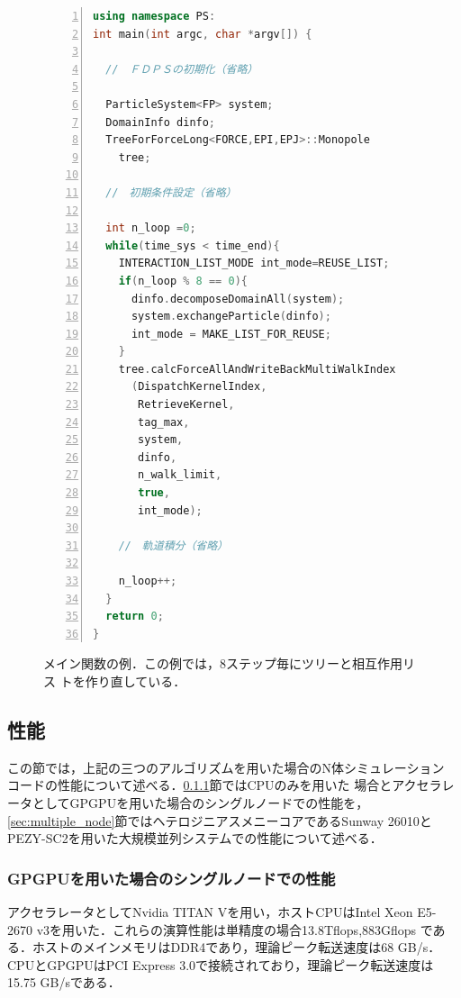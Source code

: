 \documentclass[submit]{ipsj}
\begin{document}
\begin{figure}[!h]
\begin{lstlisting}[language=c++,numbers=left,numbersep=5pt,frame=single,basicstyle=\ttfamily]
using namespace PS:    
int main(int argc, char *argv[]) {
      
  //　ＦＤＰＳの初期化（省略）
  
  ParticleSystem<FP> system;
  DomainInfo dinfo;
  TreeForForceLong<FORCE,EPI,EPJ>::Monopole
    tree;

  //　初期条件設定（省略）

  int n_loop =0;
  while(time_sys < time_end){
    INTERACTION_LIST_MODE int_mode=REUSE_LIST;    
    if(n_loop % 8 == 0){
      dinfo.decomposeDomainAll(system);
      system.exchangeParticle(dinfo);
      int_mode = MAKE_LIST_FOR_REUSE;
    }
    tree.calcForceAllAndWriteBackMultiWalkIndex
      (DispatchKernelIndex,
       RetrieveKernel,
       tag_max,
       system,
       dinfo,
       n_walk_limit,
       true,
       int_mode);

    //　軌道積分（省略）

    n_loop++;
  }
  return 0;
}

\end{lstlisting}
\caption{メイン関数の例．この例では，8ステップ毎にツリーと相互作用リス
  トを作り直している．}
\label{code:main}
\end{figure}
  
\subsection{性能}

この節では，上記の三つのアルゴリズムを用いた場合のN体シミュレーション
コードの性能について述べる．\ref{sec:single_node}節ではCPUのみを用いた
場合とアクセラレータとしてGPGPUを用いた場合のシングルノードでの性能を，
\ref{sec:multiple_node}節ではヘテロジニアスメニーコアであるSunway
26010とPEZY-SC2を用いた大規模並列システムでの性能について述べる．

\subsubsection{GPGPUを用いた場合のシングルノードでの性能}
\label{sec:single_node}

アクセラレータとしてNvidia TITAN Vを用い，ホストCPUはIntel Xeon
E5-2670 v3を用いた．これらの演算性能は単精度の場合13.8Tflops,883Gflops
である．ホストのメインメモリはDDR4であり，理論ピーク転送速度は68 GB/s．
CPUとGPGPUはPCI Express 3.0で接続されており，理論ピーク転送速度は15.75
GB/sである．
\end{document}
